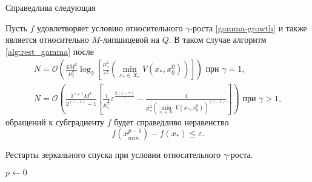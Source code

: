     Справедлива следующая
    \begin{theorem} \label{simple_restart}
        Пусть $f$ удовлетворяет условию относительного $\gamma$-роста \eqref{gamma-growth} и также является относительно $M$-липшицевой на $Q$. В таком случае алгоритм \ref{alg:rest_gamma} после 
        \begin{equation}
        \begin{aligned}
           N =\mathcal{O}\left(\frac{4 M^2}{\mu_{\gamma}^2} \log_2{\left[\frac{\mu_{\gamma}^2}{\varepsilon^2} \left(\min\limits_{x_* \in X_*}{V(x_*, x_0^0)}\right) \right]}\right) \text{ при } \gamma = 1, \\
           N = \mathcal{O}\left(\frac{2^{\gamma + 1} M^2}{2^{(\gamma - 1)} - 1}\left[\frac{1}{\mu_{\gamma}^{\frac{2}{\gamma}}} \varepsilon^{\frac{2(1 - \gamma)}{\gamma}}  - \frac{1}{\mu_{\gamma}^2 \left(\min\limits_{x_* \in X_*}{V(x_*, x_0^0)}\right)^{(\gamma - 1)}} \right]\right) \text{ при } \gamma > 1,
        \end{aligned}
        \end{equation}
        обращений к субградиенту $f$ будет справедливо неравенство
        \begin{equation}
            f(x_{min}^{p-1}) - f(x_*) \leq \varepsilon.
        \end{equation}
    \end{theorem}

    \begin{algorithm}[htp]
        \caption{Рестарты зеркального спуска при условии относительного $\gamma$-роста.}
        \label{alg:rest_gamma}
        $p \gets 0$\;
    \end{algorithm}


